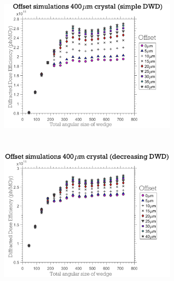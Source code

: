 \begin{figure}
	\centering
    \begin{subfigure}[b]{0.9\textwidth}
        \centering
        \includegraphics[width=\textwidth]{figures/dwd/OffsetSimulationDDMsimpleCrystSize400.pdf}
        \caption{}
        \label{fig:Offset simulations 400 - Simple Eta}
    \end{subfigure}
    \\
	\begin{subfigure}[b]{0.9\textwidth}
        \centering
        \includegraphics[width=\textwidth]{figures/dwd/OffsetSimulationDDMwrongCrystSize400.pdf}
        \caption{}
        \label{fig:Offset simulations 400 - Decreasing Eta}
    \end{subfigure}
\end{figure}
